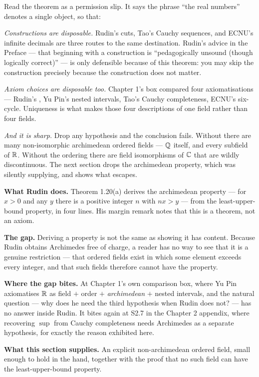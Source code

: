 \begin{deeper}
Read the theorem as a permission slip. It says the phrase ``the real
numbers'' denotes a single object, so that:

\smallskip
\emph{Constructions are disposable.} Rudin's cuts, Tao's Cauchy sequences,
and ECNU's infinite decimals are three routes to the same destination.
Rudin's advice in the Preface --- that beginning with a construction is
``pedagogically unsound (though logically correct)'' --- is only defensible
because of this theorem: you may skip the construction precisely because the
construction does not matter.

\smallskip
\emph{Axiom choices are disposable too.} Chapter 1's box compared four
axiomatisations --- Rudin's \lub{}, Yu Pin's nested intervals, Tao's Cauchy
completeness, ECNU's six-cycle. Uniqueness is what makes those four
descriptions of one field rather than four fields.

\smallskip
\emph{And it is sharp.} Drop any hypothesis and the conclusion fails.
Without \lub{} there are many non-isomorphic archimedean ordered fields ---
$\mathbb{Q}$ itself, and every subfield of $\mathbb{R}$. Without the ordering there are
field isomorphisms of $\mathbb{C}$ that are wildly discontinuous. The next section
drops the archimedean property, which \lub{} was silently supplying, and
shows what escapes.
\end{deeper}


\begin{roadmap}
\raggedright
\textbf{What Rudin does.} Theorem 1.20(a) derives the archimedean property
--- for $x>0$ and any $y$ there is a positive integer $n$ with $nx>y$ ---
from the least-upper-bound property, in four lines. His margin remark notes
that this is a theorem, not an axiom.

\smallskip
\textbf{The gap.} Deriving a property is not the same as showing it has
content. Because Rudin obtains Archimedes free of charge, a reader has no
way to see that it is a genuine restriction --- that ordered fields exist in
which some element exceeds every integer, and that such fields therefore
cannot have the \lub{} property.

\smallskip
\textbf{Where the gap bites.} At Chapter 1's own comparison box, where Yu Pin
axiomatises $\mathbb{R}$ as field $+$ order $+$ \emph{archimedean} $+$ nested
intervals, and the natural question --- why does he need the third
hypothesis when Rudin does not? --- has no answer inside Rudin. It bites
again at S2.7 in the Chapter 2 appendix, where recovering $\sup$ from Cauchy
completeness needs Archimedes as a separate hypothesis, for exactly the
reason exhibited here.

\smallskip
\textbf{What this section supplies.} An explicit non-archimedean ordered
field, small enough to hold in the hand, together with the proof that no such
field can have the least-upper-bound property.
\end{roadmap}

